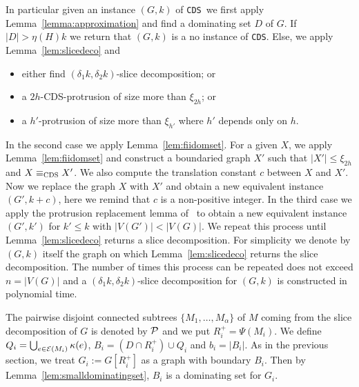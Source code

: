 \documentclass[11pt]{article}
\newcommand{\tCDS}{{\texttt{\sc CDS}}}
\begin{document}
In particular given an instance $(G,k)$ of \tCDS \,  we first apply Lemma~\ref{lemma:approximation} and find  a dominating set $D$ of $G$. 
If $|D|>\eta(H)k$ we return that $(G,k)$ is a {\sc no} instance of \tCDS. Else, 
we apply Lemma~\ref{lem:slicedeco} and
\begin{itemize}
\item  either find  $(\delta_1k,\delta_2 k)$-slice decomposition; or 
\item a $2h$-{\sc CDS}-protrusion of size more than $\xi_{2h}$; or
\item a $h'$-protrusion of size more than $\xi_{h'}$ where $h'$ depends only on $h$.
\end{itemize}
In the second case we apply Lemma~\ref{lem:fiidomset}. For a given $X$, we apply Lemma~\ref{lem:fiidomset} and construct a boundaried graph $X'$ such that $|X'|\leq \xi_{2h}$ and $X\equiv_{\tCDS} X'$. We also compute the translation constant $c$ between $X$ 
and $X'$.  Now we replace the graph $X$ with $X'$ and obtain a new equivalent instance $(G',k+c)$, here we remind that $c$ is a  non-positive integer. In the third case we apply the protrusion replacement lemma of~\cite[Lemma~7]{H.Bodlaender:2009ng} to obtain a new equivalent instance $(G',k')$ for $k' \leq k$ with $|V(G')| < |V(G)|$. We repeat this process until Lemma~\ref{lem:slicedeco}  returns a slice decomposition. 
For simplicity we denote by $(G,k)$ itself the graph on which Lemma~\ref{lem:slicedeco} returns the slice decomposition. The number of times this process can be repeated  does not exceed  $n=|V(G)|$ and a  $(\delta_1k,\delta_2 k)$-slice decomposition for $(G,k)$ is constructed  in polynomial time.   

 The pairwise disjoint connected subtrees $\{M_1,\ldots,M_\alpha\}$  of $M$ coming 
from the slice decomposition of $G$ is denoted by  $\cal P$ and we put  $R_i^+= \Psi(M_i)$.
We define   $Q_i=\bigcup _{e\in {\cal E}(M_i)}\kappa(e)$, $B_i=(D \cap R_i^+)\cup Q_i$ and $b_i=|B_i|$.  
As in the previous section,  we   treat  $G_i:=G[R_{i}^+]$ as a  graph with boundary $B_i$.  
Then by Lemma~\ref{lem:smalldominatingset},  
$B_i$ is a dominating set for $G_i$. 
\end{document}
